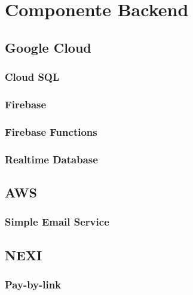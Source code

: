 \section{Componente Backend}
\subsection{Google Cloud}
\subsubsection{Cloud SQL}
\subsubsection{Firebase}
\subsubsection{Firebase Functions}
\subsubsection{Realtime Database}
\subsection{AWS}
\subsubsection{Simple Email Service}
\subsection{NEXI}
\subsubsection{Pay-by-link}